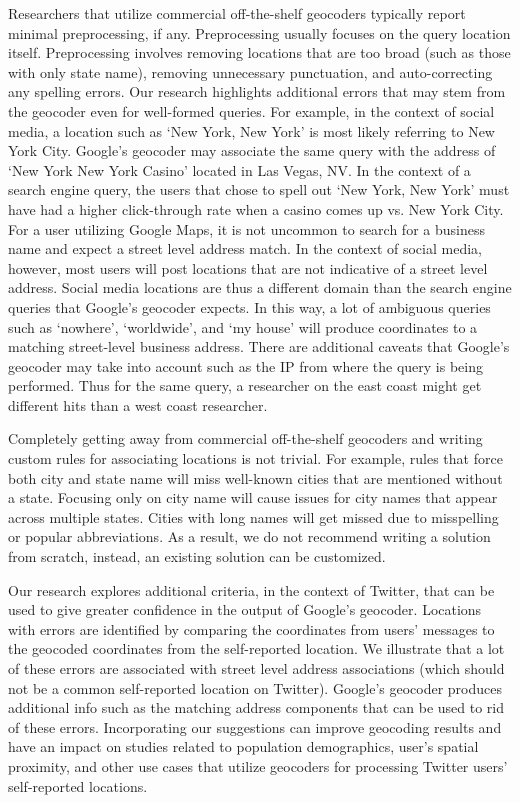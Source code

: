 Researchers that utilize commercial off-the-shelf geocoders typically report minimal preprocessing, if any. Preprocessing usually focuses on the query location itself. Preprocessing involves removing locations that are too broad (such as those with only state name), removing unnecessary punctuation, and auto-correcting any spelling errors. Our research highlights additional errors that may stem from the geocoder even for well-formed queries. For example, in the context of social media, a location such as `New York, New York' is most likely referring to New York City. Google's geocoder may associate the same query with the address of `New York New York Casino' located in Las Vegas, NV. In the context of a search engine query, the users that chose to spell out `New York, New York' must have had a higher click-through rate when a casino comes up vs. New York City. For a user utilizing Google Maps, it is not uncommon to search for a business name and expect a street level address match. In the context of social media, however, most users will post locations that are not indicative of a street level address. Social media locations are thus a different domain than the search engine queries that Google's geocoder expects. In this way, a lot of ambiguous queries such as `nowhere', `worldwide', and `my house' will produce coordinates to a matching street-level business address. There are additional caveats that Google's geocoder may take into account such as the IP from where the query is being performed. Thus for the same query, a researcher on the east coast might get different hits than a west coast researcher. 

Completely getting away from commercial off-the-shelf geocoders and writing custom rules for associating locations is not trivial. For example, rules that force both city and state name will miss well-known cities that are mentioned without a state. Focusing only on city name will cause issues for city names that appear across multiple states. Cities with long names will get missed due to misspelling or popular abbreviations. As a result, we do not recommend writing a solution from scratch, instead, an existing solution can be customized. 

Our research explores additional criteria, in the context of Twitter, that can be used to give greater confidence in the output of Google's geocoder. Locations with errors are identified by comparing the coordinates from users' messages to the geocoded coordinates from the self-reported location. We illustrate that a lot of these errors are associated with street level address associations (which should not be a common self-reported location on Twitter). Google's geocoder produces additional info such as the matching address components that can be used to rid of these errors. Incorporating our suggestions can %
improve geocoding results and have an impact on studies related to population demographics, user's spatial proximity, and other use cases that utilize geocoders for processing Twitter users' self-reported locations.

